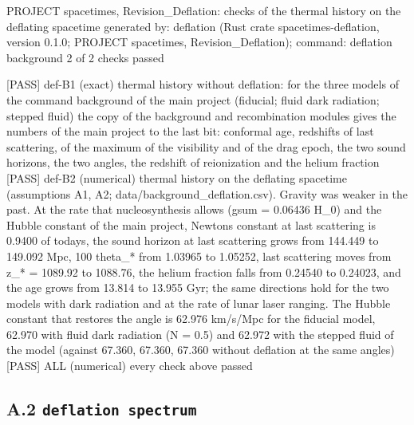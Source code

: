 \documentclass[
  10pt,
]{article}
\newenvironment{Shaded}{}{}
\newcommand{\NormalTok}[1]{#1}
\begin{document}
\begin{Shaded}
\begin{Highlighting}[]
\NormalTok{PROJECT spacetimes, Revision\_Deflation: checks of the thermal history on the deflating spacetime}
\NormalTok{generated by: deflation (Rust crate spacetimes{-}deflation, version 0.1.0; PROJECT spacetimes, Revision\_Deflation); command: deflation background}
\NormalTok{2 of 2 checks passed}

\NormalTok{[PASS] def{-}B1  (exact) thermal history without deflation: for the three models of the command \textasciigrave{}background\textasciigrave{} of the main project (fiducial; fluid dark radiation; stepped fluid) the copy of the background and recombination modules gives the numbers of the main project to the last bit: conformal age, redshifts of last scattering, of the maximum of the visibility and of the drag epoch, the two sound horizons, the two angles, the redshift of reionization and the helium fraction}
\NormalTok{[PASS] def{-}B2  (numerical) thermal history on the deflating spacetime (assumptions A1, A2; data/background\_deflation.csv). Gravity was weaker in the past. At the rate that nucleosynthesis allows (gsum = 0.06436 H\_0) and the Hubble constant of the main project, Newton\textquotesingle{}s constant at last scattering is 0.9400 of today\textquotesingle{}s, the sound horizon at last scattering grows from 144.449 to 149.092 Mpc, 100 theta\_* from 1.03965 to 1.05252, last scattering moves from z\_* = 1089.92 to 1088.76, the helium fraction falls from 0.24540 to 0.24023, and the age grows from 13.814 to 13.955 Gyr; the same directions hold for the two models with dark radiation and at the rate of lunar laser ranging. The Hubble constant that restores the angle is 62.976 km/s/Mpc for the fiducial model, 62.970 with fluid dark radiation (N = 0.5) and 62.972 with the stepped fluid of the model (against 67.360, 67.360, 67.360 without deflation at the same angles)}
\NormalTok{[PASS] ALL  (numerical) every check above passed}
\end{Highlighting}
\end{Shaded}

\hypertarget{a.2-deflation-spectrum}{%
\subsection{\texorpdfstring{A.2
\texttt{deflation\ spectrum}}{A.2 deflation spectrum}}\label{a.2-deflation-spectrum}}
\end{document}
